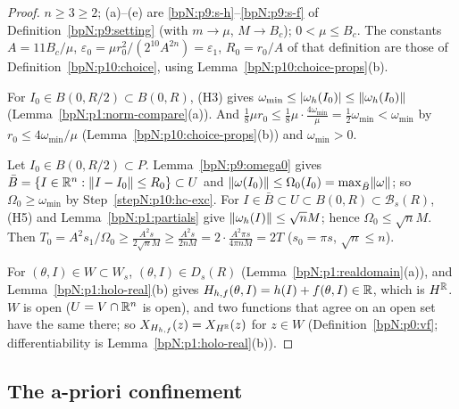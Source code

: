 \begin{proof}
\label{stepN:p10:hc-setting} $n\ge3\ge2$; (a)--(e) are \ref{bpN:p9:s-h}--\ref{bpN:p9:s-f} of Definition~\ref{bpN:p9:setting} (with $m\to\mu$, $M\to B_c$); $0<\mu\le B_c$. The constants $A=11B_c/\mu$, $\varepsilon_0=\mu r_0^2/(2^{10}A^{2n})=\varepsilon_1$, $R_0=r_0/A$ of that definition are those of Definition~\ref{bpN:p10:choice}, using Lemma~\ref{bpN:p10:choice-props}(b).

\label{stepN:p10:hc-exc} For $I_0\in B(0,R/2)\subset B(0,R)$, (H3) gives $\omega_{\min}\le\lvert \omega_h(I_0)\rvert\le\lVert \omega_h(I_0)\rVert$ (Lemma~\ref{bpN:p1:norm-compare}(a)). And $\frac18\mu r_0\le\frac18\mu\cdot\frac{4\omega_{\min}}\mu=\frac12\omega_{\min}<\omega_{\min}$ by $r_0\le4\omega_{\min}/\mu$ (Lemma~\ref{bpN:p10:choice-props}(b)) and $\omega_{\min}>0$.

\label{stepN:p10:hc-time} Let $I_0\in B(0,R/2)\subset P$. Lemma~\ref{bpN:p9:omega0} gives $\bar B=\{I\in\mathbb{R}^n:\lVert I-I_0\rVert\le R_0\}\subset U$ and $\lVert \omega(I_0)\rVert\le\Omega_0(I_0)=\max_{\bar B}\lVert \omega\rVert$; so $\Omega_0\ge\omega_{\min}$ by Step~\ref{stepN:p10:hc-exc}. For $I\in\bar B\subset U\subset B(0,R)\subset\mathcal B_s(R)$, (H5) and Lemma~\ref{bpN:p1:partials} give $\lVert \omega_h(I)\rVert\le\sqrt nM$; hence $\Omega_0\le\sqrt nM$. Then $T_0=A^2s_1/\Omega_0\ge\frac{A^2s}{2\sqrt nM}\ge\frac{A^2s}{2nM}=2\cdot\frac{A^2\pi s}{4\pi nM}=2T$ ($s_0=\pi s$, $\sqrt n\le n$).

\label{stepN:p10:hc-field} For $(\theta,I)\in W\subset W_s$, $(\theta,I)\in D_s(R)$ (Lemma~\ref{bpN:p1:realdomain}(a)), and Lemma~\ref{bpN:p1:holo-real}(b) gives $H_{h,f}(\theta,I)=h(I)+f(\theta,I)\in\mathbb{R}$, which is $H^{\mathbb{R}}$. $W$ is open ($U=V\cap\mathbb{R}^n$ is open), and two functions that agree on an open set have the same  there; so $X_{H_{h,f}}(z)=X_{H^{\mathbb{R}}}(z)$ for $z\in W$ (Definition~\ref{bpN:p0:vf}; differentiability is Lemma~\ref{bpN:p1:holo-real}(b)).
\end{proof}

\subsection{The a-priori confinement}\label{bpN:p10:s-conf}

